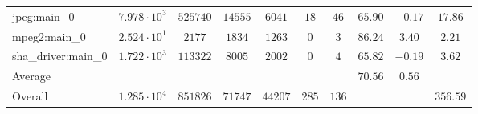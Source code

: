 \begin{tabular}{|l|c|c|c|c|c|c|c|c|c|}
jpeg:main\_0            & $ 7.978 \cdot 10^{3} $ & $ 525740 $ & $ 14555 $ & $ 6041  $ & $ 18  $ & $ 46  $ & $ 65.90       $ & $ -0.17   $ & $ 17.86   $ \\
mpeg2:main\_0           & $ 2.524 \cdot 10^{1} $ & $ 2177   $ & $ 1834  $ & $ 1263  $ & $ 0   $ & $ 3   $ & $ 86.24       $ & $ 3.40    $ & $ 2.21    $ \\
sha\_driver:main\_0     & $ 1.722 \cdot 10^{3} $ & $ 113322 $ & $ 8005  $ & $ 2002  $ & $ 0   $ & $ 4   $ & $ 65.82       $ & $ -0.19   $ & $ 3.62    $ \\
\hline
Average                 & $                    $ & $        $ & $       $ & $       $ & $     $ & $     $ & $ 70.56       $ & $ 0.56    $ & $         $ \\
\hline
Overall                 & $ 1.285 \cdot 10^{4} $ & $ 851826 $ & $ 71747 $ & $ 44207 $ & $ 285 $ & $ 136 $ & $             $ & $         $ & $ 356.59  $ \\
\hline
\end{tabular}
